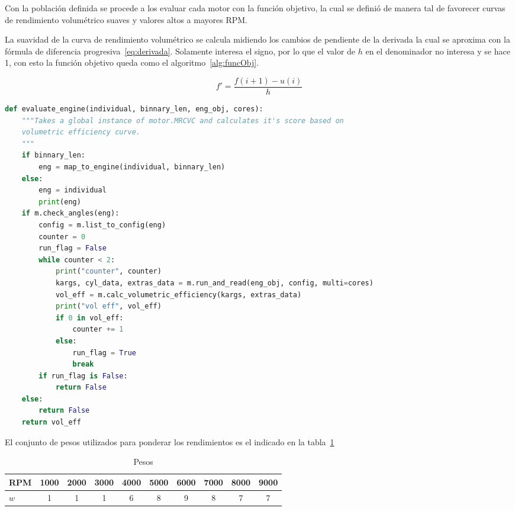 
Con la población definida se procede a los evaluar cada motor con la función
objetivo, la cual se definió de manera tal de favorecer curvas de rendimiento
volumétrico suaves y valores altos a mayores RPM.\@

La suavidad de la curva de rendimiento volumétrico se calcula midiendo los
cambios de pendiente de la derivada la cual se aproxima con la fórmula de
diferencia progresiva~\ref{eq:derivada}.
%
Solamente interesa el signo, por lo que el valor de $h$ en el denominador no
interesa y se hace 1, con esto la función objetivo queda como el
algoritmo~\ref{alg:funcObj}.

\begin{equation}\label{eq:derivada}
  f' = \frac{f(i+1) - u(i)}{h}
\end{equation}

\begin{lstlisting}[language=Python]
def evaluate_engine(individual, binnary_len, eng_obj, cores):
    """Takes a global instance of motor.MRCVC and calculates it's score based on
    volumetric efficiency curve.
    """
    if binnary_len:
        eng = map_to_engine(individual, binnary_len)
    else:
        eng = individual
        print(eng)
    if m.check_angles(eng):
        config = m.list_to_config(eng)
        counter = 0
        run_flag = False
        while counter < 2:
            print("counter", counter)
            kargs, cyl_data, extras_data = m.run_and_read(eng_obj, config, multi=cores)
            vol_eff = m.calc_volumetric_efficiency(kargs, extras_data)
            print("vol eff", vol_eff)
            if 0 in vol_eff:
                counter += 1
            else:
                run_flag = True
                break
        if run_flag is False:
            return False
    else:
        return False
    return vol_eff
\end{lstlisting}

El conjunto de pesos utilizados para ponderar los rendimientos es el indicado
en la tabla~\ref{tab:pesos}


\begin{table}
  \centering
  \begin{tabular}{lccccccccc} \toprule
      RPM & 1000 & 2000 & 3000 & 4000 & 5000 & 6000 & 7000 & 8000 & 9000 \\ \midrule
      $w$ & 1 & 1 & 1 & 6 & 8 & 9 & 8 & 7 & 7 \\ \bottomrule 
  \end{tabular}
  \caption{Pesos}\label{tab:pesos}
\end{table}


